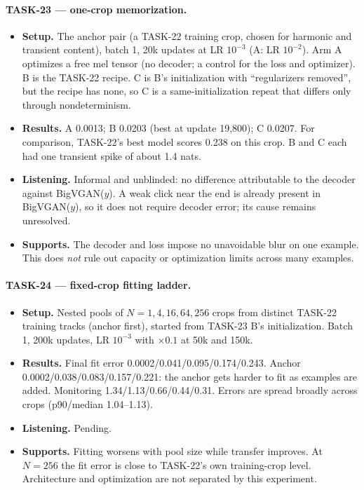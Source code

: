 \documentclass[10pt,letterpaper]{article}
\begin{document}
\paragraph{TASK-23 --- one-crop memorization.}
\begin{itemize}
\item \textbf{Setup.} The anchor pair (a TASK-22 training crop, chosen for harmonic and transient content), batch 1, 20k updates at LR $10^{-3}$ (A: LR $10^{-2}$). Arm A optimizes a free mel tensor (no decoder; a control for the loss and optimizer). B is the TASK-22 recipe. C is B's initialization with ``regularizers removed'', but the recipe has none, so C is a same-initialization repeat that differs only through nondeterminism.
\item \textbf{Results.} A 0.0013; B 0.0203 (best at update 19{,}800); C 0.0207. For comparison, TASK-22's best model scores 0.238 on this crop. B and C each had one transient spike of about 1.4 nats.
\item \textbf{Listening.} Informal and unblinded: no difference attributable to the decoder against BigVGAN($y$). A weak click near the end is already present in BigVGAN($y$), so it does not require decoder error; its cause remains unresolved.
\item \textbf{Supports.} The decoder and loss impose no unavoidable blur on one example. This does \emph{not} rule out capacity or optimization limits across many examples.
\end{itemize}

\paragraph{TASK-24 --- fixed-crop fitting ladder.}
\begin{itemize}
\item \textbf{Setup.} Nested pools of $N=1,4,16,64,256$ crops from distinct TASK-22 training tracks (anchor first), started from TASK-23 B's initialization. Batch 1, 200k updates, LR $10^{-3}$ with $\times0.1$ at 50k and 150k.
\item \textbf{Results.} Final fit error 0.0002/0.041/0.095/0.174/0.243. Anchor 0.0002/0.038/0.083/0.157/0.221: the anchor gets harder to fit as examples are added. Monitoring 1.34/1.13/0.66/0.44/0.31. Errors are spread broadly across crops (p90/median 1.04--1.13).
\item \textbf{Listening.} Pending.
\item \textbf{Supports.} Fitting worsens with pool size while transfer improves. At $N{=}256$ the fit error is close to TASK-22's own training-crop level. Architecture and optimization are not separated by this experiment.
\end{itemize}
\end{document}
